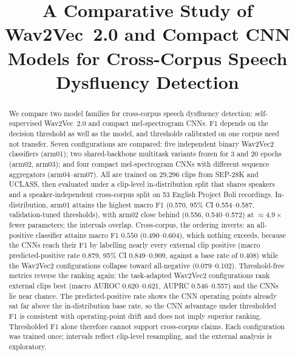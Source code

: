 \documentclass[a4paper,orivec]{llncs}
\begin{document}
%
\title{A Comparative Study of {Wav2Vec}~2.0 and Compact {CNN} Models for
Cross-Corpus Speech Dysfluency Detection}
%
%
\author{}
%
\authorrunning{}
%
\institute{}
%
\maketitle              %
%
\begin{abstract}
We compare two model families for cross-corpus speech dysfluency detection:
self-supervised Wav2Vec~2.0 and compact mel-spectrogram CNNs. F1 depends on the
decision threshold as well as the model, and thresholds calibrated on one corpus
need not transfer. Seven configurations are compared: five independent binary
Wav2Vec2 classifiers (arm01); two shared-backbone multitask variants frozen for 3
and 20 epochs (arm02, arm03); and four compact mel-spectrogram CNNs with
different sequence aggregators (arm04--arm07). All are trained on 29{,}296
clips from SEP-28K and UCLASS, then evaluated under a
clip-level in-distribution split that shares speakers and a speaker-independent
cross-corpus split on 53 English Project Boli recordings. In-distribution, arm01 attains
the highest macro F1 (0.570, 95\% CI 0.554--0.587, validation-tuned
thresholds), with arm02 close behind (0.556, 0.540--0.572) at
${\approx}4.9\times$ fewer parameters; the intervals overlap. Cross-corpus, the
ordering inverts: an all-positive classifier attains macro F1 $0.550$
(0.490--0.604), which nothing exceeds, because the CNNs reach their F1
by labelling nearly every external clip positive (macro predicted-positive rate
0.879, 95\% CI 0.849--0.909, against a base rate of 0.408) while the Wav2Vec2
configurations collapse toward all-negative (0.079--0.102). Threshold-free
metrics reverse the ranking again: the task-adapted Wav2Vec2 configurations
rank external clips best (macro AUROC 0.620--0.621, AUPRC 0.546--0.557) and
the CNNs lie near chance. The predicted-positive rate shows the CNN operating
points already sat far above the in-distribution base rate, so the CNN advantage
under thresholded F1 is consistent with operating-point drift and does not
imply superior ranking. Thresholded F1 alone therefore cannot support
cross-corpus claims. Each configuration was trained once;
intervals reflect clip-level resampling, and the external analysis is
exploratory.
\end{abstract}
%
\end{document}
